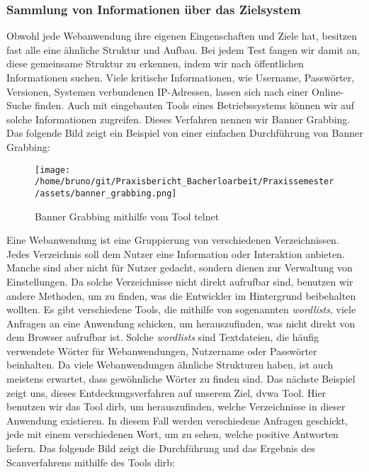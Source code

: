 \subsubsection{Sammlung von Informationen über das Zielsystem}

Obwohl jede Webanwendung ihre eigenen Eingenschaften und Ziele hat, besitzen fast alle eine ähnliche Struktur und Aufbau. Bei jedem Test fangen wir damit an, diese gemeinsame Struktur zu erkennen, indem wir nach öffentlichen Informationen suchen. Viele kritische Informationen, wie Username, Passwörter, Versionen, Systemen verbundenen IP-Adressen, lassen sich nach einer Online-Suche finden. Auch mit eingebauten Tools eines Betriebssystems können wir auf solche Informationen zugreifen. Dieses Verfahren nennen wir Banner Grabbing. Das folgende Bild zeigt ein Beispiel von einer einfachen Durchführung von Banner Grabbing:

\begin{figure}[H]
    \centering
    \texttt{[image: /home/bruno/git/Praxisbericht\_Bacherloarbeit/Praxissemester/assets/banner\_grabbing.png]}
    \caption{Banner Grabbing mithilfe vom Tool telnet}
    \centering
\end{figure}

Eine Webanwendung ist eine Gruppierung von verschiedenen Verzeichnissen. Jedes Verzeichnis soll dem Nutzer eine Information oder Interaktion anbieten. Manche sind aber nicht für Nutzer gedacht, sondern dienen zur Verwaltung von Einstellungen. Da solche Verzeichnisse nicht direkt aufrufbar sind, benutzen wir andere Methoden, um zu finden, was die Entwickler im Hintergrund beibehalten wollten. Es gibt verschiedene Tools, die mithilfe von sogenannten \textit{wordlists}, viele Anfragen an eine Anwendung schicken, um herauszufinden, was nicht direkt von dem Browser aufrufbar ist. Solche \textit{wordlists} sind Textdateien, die häufig verwendete Wörter für Webanwendungen, Nutzername oder Passwörter beinhalten. Da viele Webanwendungen ähnliche Strukturen haben, ist auch meistens erwartet, dass gewöhnliche Wörter zu finden sind. Das nächste Beispiel zeigt uns, dieses Entdeckungsverfahren auf unserem Ziel, \gls{dvwa} Tool. Hier benutzen wir das Tool \gls{dirb}, um herauszufinden, welche Verzeichnisse in dieser Anwendung existieren. In diesem Fall werden verschiedene Anfragen geschickt, jede mit einem verschiedenen Wort, um zu sehen, welche positive Antworten liefern. Das folgende Bild zeigt die Durchführung und das Ergebnis des Scanverfahrens mithilfe des Tools \gls{dirb}:

